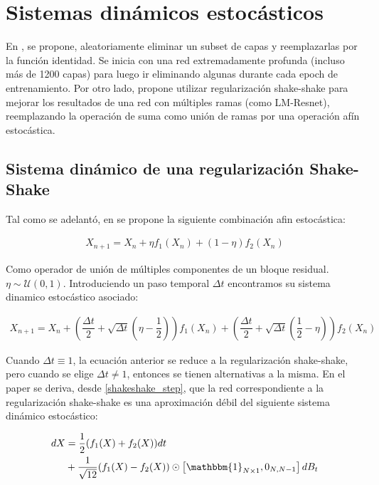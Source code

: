 \documentclass[titlepage,a4paper,oneside]{article}
\begin{document}
\section{Sistemas dinámicos estocásticos}
En \cite{huang2016deep}, se propone, aleatoriamente eliminar un subset de capas y reemplazarlas por la función identidad. Se inicia con una red extremadamente profunda (incluso más de 1200 capas) para luego ir eliminando algunas durante cada epoch de entrenamiento. Por otro lado, \cite{gastaldi2017shakeshake} propone utilizar regularización shake-shake para mejorar los resultados de una red con múltiples ramas (como LM-Resnet), reemplazando la operación de suma como unión de ramas por una operación afín estocástica.

\subsection{Sistema dinámico de una regularización Shake-Shake}
Tal como se adelantó, en \cite{gastaldi2017shakeshake} se propone la siguiente combinación afin estocástica:

\begin{align}
	X_{n+1} = X_n + \eta f_1(X_n) + (1-\eta) f_2 (X_n)
\end{align}

Como operador de unión de múltiples componentes de un bloque residual. $\eta \sim \mathscr{U}(0,1)$. Introduciendo un paso temporal $\Delta t$ encontramos su sistema dinamico estocástico asociado:

\begin{align}\label{shakeshake_step}
	X_{n+1} = X_n + \left(\dfrac{\Delta t}{2} + \sqrt{\Delta t}(\eta - \dfrac{1}{2})\right) f_1(X_n) + \left( \dfrac{\Delta t}{2} + \sqrt{\Delta t} (\dfrac{1}{2} - \eta) \right) f_2(X_n)
\end{align}

Cuando $\Delta t \equiv 1$, la ecuación anterior se reduce a la regularización shake-shake, pero cuando se elige $\Delta t \neq 1$, entonces se tienen alternativas a la misma. En el paper se deriva, desde \ref{shakeshake_step}, que la red correspondiente a la regularización shake-shake es una aproximación débil del siguiente sistema dinámico estocástico:

\begin{align}
	dX &= \dfrac{1}{2} (f_1(X) + f_2(X)) dt\\
	   &+ \dfrac{1}{\sqrt{12}} (f_1(X) - f_2(X)) \odot \left[ \mathbbm{1}_{N\times 1}, 0_{N,N-1} \right] dB_t
\end{align}
\end{document}
